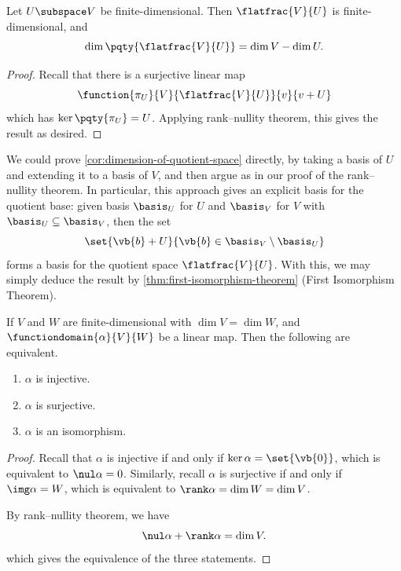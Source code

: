 \begin{corollary}
    \label{cor:dimension-of-quotient-space}%
    Let \(U \subspace V\) be finite-dimensional. Then \(\flatfrac{V}{U}\) is finite-dimensional, and
    \[
        \dim \pqty{\flatfrac{V}{U}} = \dim V - \dim U.
    \]
\end{corollary}

\begin{proof}
    Recall that there is a surjective linear map
    \[
        \function{\pi_U}{V}{\flatfrac{V}{U}}{v}{v + U}
    \]
    which has \(\ker \pqty{\pi_U} = U\). Applying rank--nullity theorem, this gives the result as desired.
\end{proof}

\begin{remark}
    We could prove \autoref{cor:dimension-of-quotient-space} directly, by taking a basis of \(U\) and extending it to a basis of \(V\), and then argue as in our proof of the rank--nullity theorem. In particular, this approach gives an explicit basis for the quotient base: given basis \(\basis_U\) for \(U\) and \(\basis_V\) for \(V\) with \(\basis_U \subseteq \basis_V\), then the set
    \[
        \set{\vb{b} + U}{\vb{b} \in \basis_V \setminus \basis_U}
    \]
    forms a basis for the quotient space \(\flatfrac{V}{U}\). With this, we may simply deduce the result by \autoref{thm:first-isomorphism-theorem} (First Isomorphism Theorem).
\end{remark}

\begin{corollary}
    If \(V\) and \(W\) are finite-dimensional with \(\dim V = \dim W\), and \(\functiondomain{\alpha}{V}{W}\) be a linear map. Then the following are equivalent.
    \begin{enumerate}[label=(\roman*)]
        \item \(\alpha\) is injective.
        \item \(\alpha\) is surjective.
        \item \(\alpha\) is an isomorphism.
    \end{enumerate}
\end{corollary}

\begin{proof}
    Recall that \(\alpha\) is injective if and only if \(\ker \alpha = \set{\vb{0}}\), which is equivalent to \(\nul \alpha = 0\). Similarly, recall \(\alpha\) is surjective if and only if \(\img \alpha = W\), which is equivalent to \(\rank \alpha = \dim W = \dim V\).

    By rank--nullity theorem, we have
    \[
        \nul \alpha + \rank \alpha = \dim V.
    \]
    which gives the equivalence of the three statements.
\end{proof}

